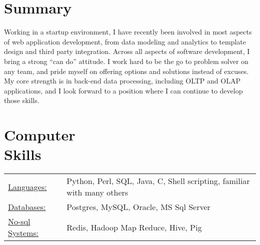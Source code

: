 \documentclass[margin]{res}
\begin{document}

\address{1404 Duckwall Road \\ Berkeley Springs, WV 25411  \\
        (917) 678-3636 \\ mark.tozzi@gmail.com}


\begin{resume}

\section{Summary}
Working in a startup environment, I have recently been involved in most 
aspects of web application development, from data modeling and analytics 
to template design and third party integration. Across all aspects of 
software development, I bring a strong “can do” attitude. I work hard to 
be the go to problem solver on any team, and pride myself on offering options 
and solutions instead of excuses. My core strength is in back-end data 
processing, including OLTP and OLAP applications, and I look forward to a 
position where I can continue to develop those skills.

\section{Computer \\ Skills}
   \begin{tabular}{l p{3in}}
    \underline{Languages:} & Python, Perl, SQL, Java, C, Shell scripting,
     familiar with many others \\

     \underline{Databases:} & Postgres, MySQL, Oracle, MS Sql Server \\
     \underline{No-sql Systems:} & Redis, Hadoop Map Reduce, Hive, Pig
   \end{tabular}


\end{resume}
\end{document}
